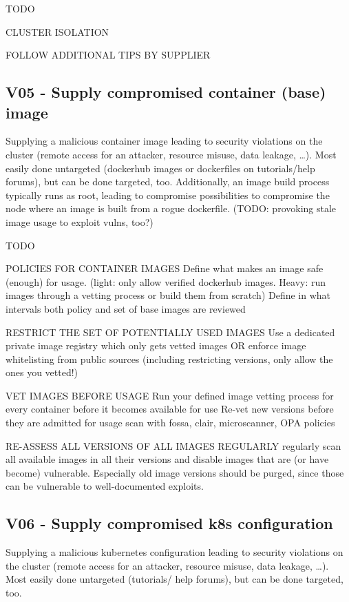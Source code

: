 TODO

CLUSTER ISOLATION

FOLLOW ADDITIONAL TIPS BY SUPPLIER


\subsection{V05 - Supply compromised container (base) image}
Supplying a malicious container image leading to security violations on the cluster (remote access for an attacker, resource misuse, data leakage, …). Most easily done untargeted (dockerhub images or dockerfiles on tutorials/help forums), but can be done targeted, too. Additionally, an image build process typically runs as root, leading to compromise possibilities to compromise the node where an image is built from a rogue dockerfile. (TODO: provoking stale image usage to exploit vulns, too?)

TODO

POLICIES FOR CONTAINER IMAGES
	Define what makes an image safe (enough) for usage. (light: only allow verified dockerhub images. Heavy: run images through a vetting process or build them from scratch)
	Define in what intervals both policy and set of base images are reviewed

RESTRICT THE SET OF POTENTIALLY USED IMAGES
	Use a dedicated private image registry which only gets vetted images OR enforce image whitelisting from public sources (including restricting versions, only allow the ones you vetted!)
	
VET IMAGES BEFORE USAGE
	Run your defined image vetting process for every container before it becomes available for use
	Re-vet new versions before they are admitted for usage
	scan with fossa, clair, microscanner, OPA policies

RE-ASSESS ALL VERSIONS OF ALL IMAGES REGULARLY
	regularly scan all available images in all their versions and disable images that are (or have become) vulnerable. Especially old image versions should be purged, since those can be vulnerable to well-documented exploits.

\subsection{V06 - Supply compromised k8s configuration}
Supplying a malicious kubernetes configuration leading to security violations on the cluster (remote access for an attacker, resource misuse, data leakage, …). Most easily done untargeted (tutorials/ help forums), but can be done targeted, too.

